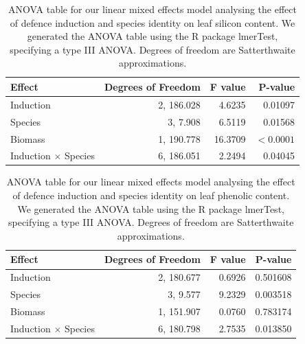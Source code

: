 \documentclass[12pt, letterpaper]{report}
\begin{document}
\begin{table}[ht]
        \centering
        \caption{ANOVA table for our linear mixed effects model analysing the effect of defence induction and species identity on leaf silicon content. We generated the ANOVA table using the R package lmerTest, specifying a type III ANOVA. Degrees of freedom are Satterthwaite approximations.}
        \label{Tab:si_params}
        \begin{tabular}{lrrr}
               \hline
                \textbf{Effect} & \textbf{Degrees of Freedom} & \textbf{F value} &    \textbf{P-value} \\ 
                \hline   
                Induction         &  2, 186.028 &  4.6235 &   0.01097 \\  
                Species           &  3, 7.908 &  6.5119 &   0.01568 \\  
                Biomass            &  1, 190.778 & 16.3709 & $<0.0001$ \\
                Induction $\times$ Species  &    6, 186.051 &  2.2494 &   0.04045 \\  
                \hline
        \end{tabular}
\end{table}

\begin{table}[ht]
        \centering
        \caption{ANOVA table for our linear mixed effects model analysing the effect of defence induction and species identity on leaf phenolic content. We generated the ANOVA table using the R package lmerTest, specifying a type III ANOVA. Degrees of freedom are Satterthwaite approximations.}
        \label{Tab:phe_params}
        \begin{tabular}{lrrr}
               \hline
                \textbf{Effect} & \textbf{Degrees of Freedom} & \textbf{F value} &    \textbf{P-value} \\ 
                \hline   
                Induction         &     2, 180.677 & 0.6926 & 0.501608 \\
                Species           &     3,   9.577 & 9.2329 & 0.003518 \\
                Biomass          &     1, 151.907 & 0.0760 & 0.783174 \\
                Induction $\times$ Species &     6, 180.798 & 2.7535 & 0.013850 \\
                \hline
        \end{tabular}
\end{table}
\end{document}

